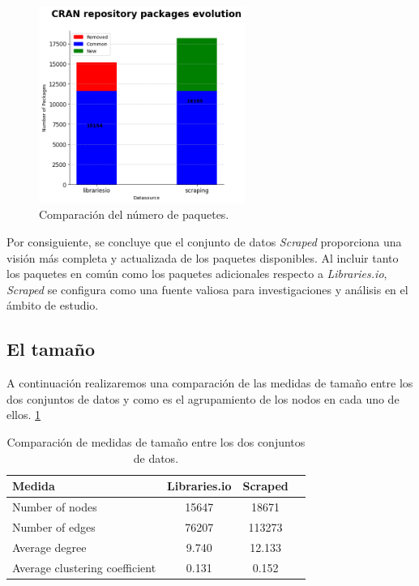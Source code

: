 \begin{figure}[ht!]
    \begin{center}
        \includegraphics[width=0.6\textwidth]{img/cran/bars.png}
        \caption{Comparación del número de paquetes.}
        \label{fig:cran_common_packages3}
    \end{center}
\end{figure}

Por consiguiente, se concluye que el conjunto de datos \textit{Scraped} proporciona una
visión más completa y actualizada de los paquetes disponibles. Al incluir tanto los paquetes
en común como los paquetes adicionales respecto a \textit{Libraries.io}, \textit{Scraped}
se configura como una fuente valiosa para investigaciones y análisis en el ámbito de estudio.


\subsection{El tamaño}

A continuación realizaremos una comparación de las medidas de tamaño entre los dos conjuntos de datos y como es
el agrupamiento de los nodos en cada uno de ellos. \ref{tab:cran_size}

\begin{table}[ht!]
    \begin{center}
        \begin{tabular}{|l|c|c|c|}
            \hline
            \textbf{Medida}                & \textbf{Libraries.io} & \textbf{Scraped} \\
            \hline
            Number of nodes                & 15647                 & 18671            \\
            Number of edges                & 76207                 & 113273           \\
            Average degree                 & 9.740                 & 12.133           \\
            Average clustering coefficient & 0.131                 & 0.152            \\
            \hline
        \end{tabular}
        \caption{Comparación de medidas de tamaño entre los dos conjuntos de datos.}
        \label{tab:cran_size}
    \end{center}
\end{table}


